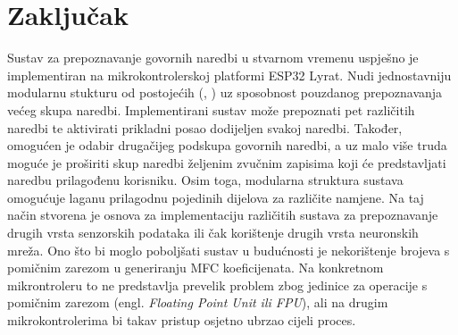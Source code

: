\chapter{Zaključak}
\label{pog:zakljucak}

Sustav za prepoznavanje govornih naredbi u stvarnom vremenu uspješno je implementiran
na mikrokontrolerskoj platformi ESP32 Lyrat. Nudi jednostavniju modularnu
stukturu od postojećih (\cite{arm_kws}, \cite{tflmicrospeech}) uz sposobnost pouzdanog 
prepoznavanja većeg skupa
naredbi. Implementirani sustav može prepoznati pet
različitih naredbi te aktivirati prikladni posao dodijeljen svakoj naredbi. 
Također, omogućen je odabir 
drugačijeg podskupa govornih naredbi, a uz malo više truda moguće je proširiti skup naredbi
željenim zvučnim zapisima koji će predstavljati naredbu prilagođenu korisniku.
Osim toga, modularna struktura sustava
omogućuje laganu prilagodnu pojedinih dijelova za različite namjene. Na taj način stvorena je
osnova za implementaciju različitih sustava za prepoznavanje drugih vrsta senzorskih podataka
ili čak korištenje drugih vrsta neuronskih mreža. Ono što bi moglo poboljšati sustav
u budućnosti je
nekorištenje brojeva s pomičnim zarezom u generiranju MFC koeficijenata. Na konkretnom
mikrontroleru to ne predstavlja prevelik problem zbog jedinice
za operacije s pomičnim zarezom (engl. \textit{Floating Point Unit ili FPU}),
ali na drugim mikrokontrolerima bi takav pristup osjetno ubrzao cijeli proces.


